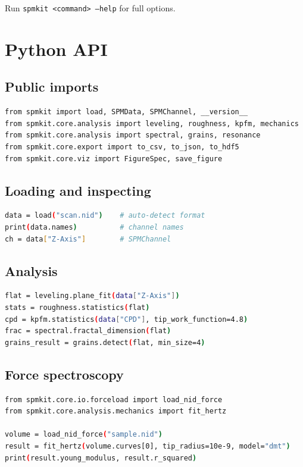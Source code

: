 \documentclass[a4paper,11pt]{article}
\begin{document}
Run \texttt{spmkit <command> --help} for full options.

\section{Python API}

\subsection{Public imports}

\begin{lstlisting}[language=bash]
from spmkit import load, SPMData, SPMChannel, __version__
from spmkit.core.analysis import leveling, roughness, kpfm, mechanics
from spmkit.core.analysis import spectral, grains, resonance
from spmkit.core.export import to_csv, to_json, to_hdf5
from spmkit.core.viz import FigureSpec, save_figure
\end{lstlisting}

\subsection{Loading and inspecting}

\begin{lstlisting}[language=bash]
data = load("scan.nid")    # auto-detect format
print(data.names)          # channel names
ch = data["Z-Axis"]        # SPMChannel
\end{lstlisting}

\subsection{Analysis}

\begin{lstlisting}[language=bash]
flat = leveling.plane_fit(data["Z-Axis"])
stats = roughness.statistics(flat)
cpd = kpfm.statistics(data["CPD"], tip_work_function=4.8)
frac = spectral.fractal_dimension(flat)
grains_result = grains.detect(flat, min_size=4)
\end{lstlisting}

\subsection{Force spectroscopy}

\begin{lstlisting}[language=bash]
from spmkit.core.io.forceload import load_nid_force
from spmkit.core.analysis.mechanics import fit_hertz

volume = load_nid_force("sample.nid")
result = fit_hertz(volume.curves[0], tip_radius=10e-9, model="dmt")
print(result.young_modulus, result.r_squared)
\end{lstlisting}
\end{document}
